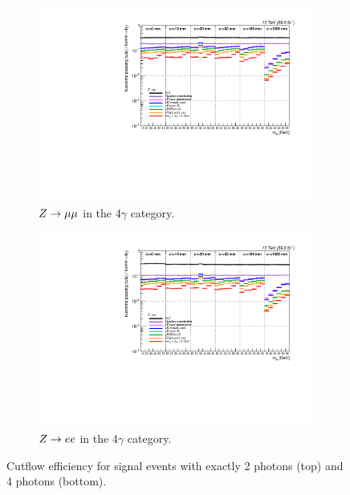 \begin{figure}[htb!]
\begin{subfigure}[h]{0.49\linewidth}
		\includegraphics[width=\linewidth]{figs/05_analysis/2018_signal_4G_Z_MU_efficiency_raw.pdf}
		\caption{$Z\to\mu\mu$ in the 4$\gamma$ category.}
	\end{subfigure}
	\begin{subfigure}[h]{0.49\linewidth}
		\centering
		\includegraphics[width=\linewidth]{figs/05_analysis/2018_signal_4G_Z_ELE_efficiency_raw.pdf}
		\caption{$Z\to ee$ in the 4$\gamma$ category.}
	\end{subfigure}
	\caption[Cutflow efficiency for signal events with exactly 2 photons (top) and 4 photons (bottom).]{Cutflow efficiency for signal events with exactly 2 photons (top) and 4 photons (bottom).}
	\label{fig:signal_acceptance}
\end{figure}


